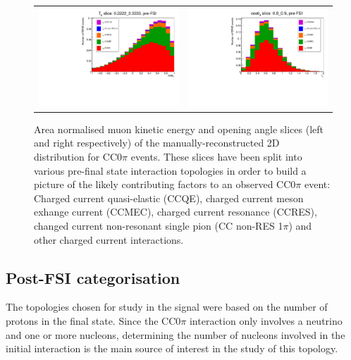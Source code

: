 \begin{figure}[h!]
    \centering
    \begin{tabular}{cc}
        \includegraphics[width=.49\textwidth, trim=0 0 0 1.2cm, clip]{images/Pre_FSI_Tmu_slice_02222_03333.pdf}
        &
        \includegraphics[width=.49\textwidth, trim=0 0 0 1.2cm, clip]{images/pre_FSI_cosmu_slice_08_09.pdf}
    \end{tabular}
    \caption{Area normalised muon kinetic energy and opening angle slices (left and right respectively) of the manually-reconstructed 2D distribution for CC0\(\pi\) events. These slices have been split into various pre-final state interaction topologies in order to build a picture of the likely contributing factors to an observed CC0\(\pi\) event: Charged current quasi-elastic (CCQE), charged current meson exhange current (CCMEC), charged current resonance (CCRES), changed current non-resonant single pion (CC non-RES 1\(\pi\)) and other charged current interactions. }
    \label{fig:preFSI}
\end{figure}

\subsection{Post-FSI categorisation}

The topologies chosen for study in the signal were based on the number of protons in the final state. Since the CC0\(\pi\) interaction only involves a neutrino and one or more nucleons, determining the number of nucleons involved in the initial interaction is the main source of interest in the study of this topology.

